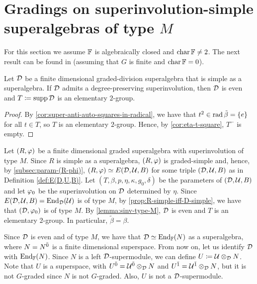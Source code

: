\section[Gradings on superinvolution-simple superalgebras of type \texorpdfstring{$M$}{M}]{Gradings on superinvolution-simple \\ superalgebras of type $M$}\label{sec:vphi-grds-on-type-M}

For this section we assume $\mathbb{F}$ is algebraically closed and $\operatorname{char} \mathbb{F} \neq 2$. 
The next result can be found in \cite[Theorem 4.3]{TT} (assuming that $G$ is finite and $\operatorname{char} \mathbb{F} = 0$). 

\begin{lemma}\label{lemma:sinv-type-M}
    Let $\mathcal{D}$ be a finite dimensional graded-division superalgebra that is simple as a superalgebra. 
    If $\mathcal{D}$ admits a degree-preserving superinvolution, then $\mathcal{D}$ is even and $T \coloneqq \operatorname{supp} \mathcal{D}$ is an elementary $2$-group. 
\end{lemma}

\begin{proof}
    By \cref{cor:super-anti-auto-squares-in-radical}, we have that $t^2 
    \in \operatorname{rad}\tilde\beta = \{e\}$ for all $t\in T$, so $T$ is an elementary $2$-group. 
    Hence, by \cref{cor:eta-t-square}, $T^-$ is empty. 
\end{proof}

Let $(R, \varphi)$ be a finite dimensional graded superalgebra with superinvolution of type $M$. 
Since $R$ is simple as a superalgebra, $(R, \varphi)$ is graded-simple and, hence, by \cref{subsec:param-(R-phi)}, $(R, \varphi) \simeq E(\mathcal{D}, \mathcal U, B)$ for some triple $(\mathcal{D}, \mathcal U, B)$ as in Definition \ref{def:E(D,U,B)}. 
Let $(T, \beta, p, \eta, \kappa, g_0, \delta)$ be the parameters of $(\mathcal{D}, \mathcal U, B)$ and let $\varphi_0$ be the superinvolution on $\mathcal{D}$ determined by $\eta$.
Since $E(\mathcal{D}, \mathcal U, B) = \operatorname{End}_{\mathcal{D}} (\mathcal U)$ is of type $M$, by \cref{prop:R-simple-iff-D-simple}, we have that $(\mathcal{D}, \varphi_0)$ is of type $M$. 
By \cref{lemma:sinv-type-M}, $\mathcal{D}$ is even and $T$ is an elementary $2$-group. 
In particular, $\tilde\beta = \beta$. 

Since $\mathcal{D}$ is even and of type $M$, we have that $\mathcal{D} \simeq \operatorname{End}_{\mathbb{F}} (N)$ as a superalgebra, where $N = N^{\bar0}$ is a finite dimensional superspace.
From now on, let us identify $\mathcal{D}$ with $\operatorname{End}_{\mathbb{F}}(N)$. 
Since $N$ is a left $\mathcal{D}$-supermodule, we can define $U \coloneqq \mathcal U \otimes_{\mathcal{D}} N$. 
Note that $U$ is a superspace, with $U^{\bar0} = \mathcal U^{\bar0} \otimes_{\mathcal{D}} N$ and $U^{\bar1} = \mathcal U^{\bar1} \otimes_{\mathcal{D}} N$, but it is not $G$-graded since $N$ is not $G$-graded. 
Also, $U$ is not a $\mathcal{D}$-supermodule. 

